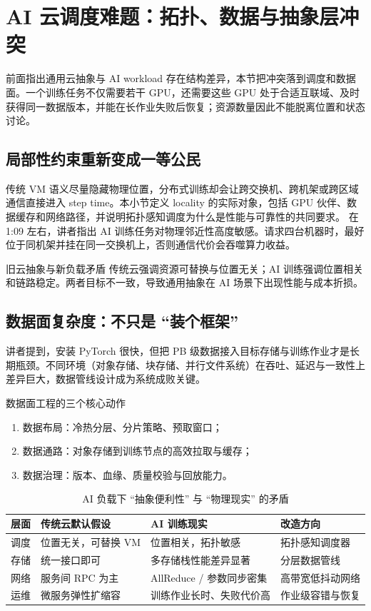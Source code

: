 \section{AI 云调度难题：拓扑、数据与抽象层冲突}

前面指出通用云抽象与 AI workload 存在结构差异，本节把冲突落到调度和数据面。一个训练任务不仅需要若干 GPU，还需要这些 GPU 处于合适互联域、及时获得同一数据版本，并能在长作业失败后恢复；资源数量因此不能脱离位置和状态讨论。

\subsection{局部性约束重新变成一等公民}
传统 VM 语义尽量隐藏物理位置，分布式训练却会让跨交换机、跨机架或跨区域通信直接进入 step time。本小节定义 locality 的实际对象，包括 GPU 伙伴、数据缓存和网络路径，并说明拓扑感知调度为什么是性能与可靠性的共同要求。
在 1:09 左右，讲者指出 AI 训练任务对物理邻近性高度敏感。请求四台机器时，最好位于同机架并挂在同一交换机上，否则通信代价会吞噬算力收益。

\begin{importantbox}{旧云抽象与新负载矛盾}
传统云强调资源可替换与位置无关；AI 训练强调位置相关和链路稳定。两者目标不一致，导致通用抽象在 AI 场景下出现性能与成本折损。
\end{importantbox}

\subsection{数据面复杂度：不只是 ``装个框架''}
讲者提到，安装 PyTorch 很快，但把 PB 级数据接入目标存储与训练作业才是长期瓶颈。不同环境（对象存储、块存储、并行文件系统）在吞吐、延迟与一致性上差异巨大，数据管线设计成为系统成败关键。

\begin{knowledgebox}{数据面工程的三个核心动作}
\begin{enumerate}
    \item 数据布局：冷热分层、分片策略、预取窗口；
    \item 数据通路：对象存储到训练节点的高效拉取与缓存；
    \item 数据治理：版本、血缘、质量校验与回放能力。
\end{enumerate}
\end{knowledgebox}

\begin{table}[H]
\centering
\begin{tabular}{p{2.8cm}p{3.8cm}p{3.7cm}p{2.7cm}}
\toprule
\textbf{层面} & \textbf{传统云默认假设} & \textbf{AI 训练现实} & \textbf{改造方向} \\
\midrule
调度 & 位置无关，可替换 VM & 位置相关，拓扑敏感 & 拓扑感知调度器 \\
存储 & 统一接口即可 & 多存储栈性能差异显著 & 分层数据管线 \\
网络 & 服务间 RPC 为主 & AllReduce / 参数同步密集 & 高带宽低抖动网络 \\
运维 & 微服务弹性扩缩容 & 训练作业长时、失败代价高 & 作业级容错与恢复 \\
\bottomrule
\end{tabular}
\caption{AI 负载下 ``抽象便利性'' 与 ``物理现实'' 的矛盾}
\end{table}

